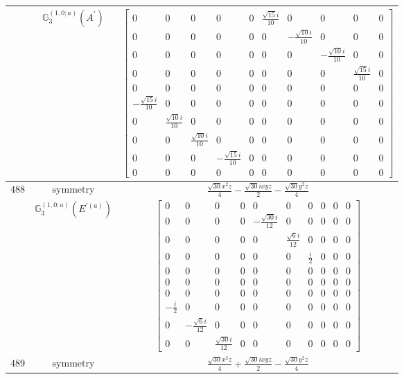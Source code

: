 \documentclass[fleqn,8pt,landscape]{jsarticle}
\begin{document}
\begin{longtable}{ccc}
$  $ & $ \mathbb{G}_{3}^{(1,0;a)}(A^{\prime}) $ & $ \begin{bmatrix} 0 & 0 & 0 & 0 & 0 & \frac{\sqrt{15} i}{10} & 0 & 0 & 0 & 0 \\ 0 & 0 & 0 & 0 & 0 & 0 & - \frac{\sqrt{10} i}{10} & 0 & 0 & 0 \\ 0 & 0 & 0 & 0 & 0 & 0 & 0 & - \frac{\sqrt{10} i}{10} & 0 & 0 \\ 0 & 0 & 0 & 0 & 0 & 0 & 0 & 0 & \frac{\sqrt{15} i}{10} & 0 \\ 0 & 0 & 0 & 0 & 0 & 0 & 0 & 0 & 0 & 0 \\ - \frac{\sqrt{15} i}{10} & 0 & 0 & 0 & 0 & 0 & 0 & 0 & 0 & 0 \\ 0 & \frac{\sqrt{10} i}{10} & 0 & 0 & 0 & 0 & 0 & 0 & 0 & 0 \\ 0 & 0 & \frac{\sqrt{10} i}{10} & 0 & 0 & 0 & 0 & 0 & 0 & 0 \\ 0 & 0 & 0 & - \frac{\sqrt{15} i}{10} & 0 & 0 & 0 & 0 & 0 & 0 \\ 0 & 0 & 0 & 0 & 0 & 0 & 0 & 0 & 0 & 0 \end{bmatrix} $ \\ \hline
$ 488 $ & $ \text{symmetry} $ & $ \frac{\sqrt{30} x^{2} z}{4} - \frac{\sqrt{30} i x y z}{2} - \frac{\sqrt{30} y^{2} z}{4} $ \\
$  $ & $ \mathbb{G}_{3}^{(1,0;a)}(E^{\prime(a)}) $ & $ \begin{bmatrix} 0 & 0 & 0 & 0 & 0 & 0 & 0 & 0 & 0 & 0 \\ 0 & 0 & 0 & 0 & - \frac{\sqrt{30} i}{12} & 0 & 0 & 0 & 0 & 0 \\ 0 & 0 & 0 & 0 & 0 & \frac{\sqrt{6} i}{12} & 0 & 0 & 0 & 0 \\ 0 & 0 & 0 & 0 & 0 & 0 & \frac{i}{2} & 0 & 0 & 0 \\ 0 & 0 & 0 & 0 & 0 & 0 & 0 & 0 & 0 & 0 \\ 0 & 0 & 0 & 0 & 0 & 0 & 0 & 0 & 0 & 0 \\ 0 & 0 & 0 & 0 & 0 & 0 & 0 & 0 & 0 & 0 \\ - \frac{i}{2} & 0 & 0 & 0 & 0 & 0 & 0 & 0 & 0 & 0 \\ 0 & - \frac{\sqrt{6} i}{12} & 0 & 0 & 0 & 0 & 0 & 0 & 0 & 0 \\ 0 & 0 & \frac{\sqrt{30} i}{12} & 0 & 0 & 0 & 0 & 0 & 0 & 0 \end{bmatrix} $ \\ \hline
$ 489 $ & $ \text{symmetry} $ & $ \frac{\sqrt{30} x^{2} z}{4} + \frac{\sqrt{30} i x y z}{2} - \frac{\sqrt{30} y^{2} z}{4} $ \\

\end{longtable}
\end{document}
